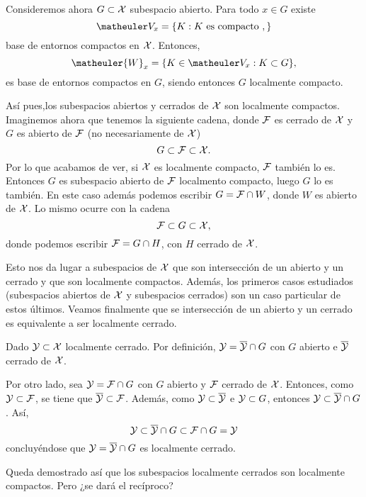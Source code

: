 Consideremos ahora $G\subset \mathcal{X}$ subespacio abierto. Para todo $x\in G$ existe
\[\Va{x}=\{K:K\text{ es compacto },\}\]
base de entornos compactos en $\mathcal{X}$. Entonces,
\[\matheuler{W}_x=\{K\in \Va{x}:K\subset G\},\]
es base de entornos compactos en $G$, siendo entonces $G$ localmente compacto.

Así pues,los subespacios abiertos y cerrados de $\mathcal{X}$ son localmente compactos. Imaginemos ahora que tenemos la siguiente cadena, donde $\mathcal{F}$ es cerrado de $\mathcal{X}$ y $G$ es abierto de $\mathcal{F}$ (no necesariamente de $\mathcal{X}$)
\[G\subset\mathcal{F}\subset\mathcal{X}.\]
Por lo que acabamos de ver, si $\mathcal{X}$ es localmente compacto, $\mathcal{F}$ también lo es. Entonces $G$ es subespacio abierto de $\mathcal{F}$ localmento compacto, luego $G$ lo es también. En este caso además podemos escribir $G=\mathcal{F}\cap W$, donde $W$ es abierto de $\mathcal{X}$. Lo mismo ocurre con la cadena
\[\mathcal{F}\subset G\subset\mathcal{X},\]
donde podemos escribir $\mathcal{F}=G\cap H$, con $H$ cerrado de $\mathcal{X}$.

Esto nos da lugar a subespacios de $\mathcal{X}$ que son intersección de un abierto y un cerrado y que son localmente compactos. Además, los primeros casos estudiados (subespacios abiertos de $\mathcal{X}$ y subespacios cerrados) son un caso particular de estos últimos. Veamos finalmente que se intersección de un abierto y un cerrado es equivalente a ser localmente cerrado.

Dado $\mathcal{Y}\subset\mathcal{X}$ localmente cerrado. Por definición, $\mathcal{Y}=\overline{\mathcal{Y}}\cap G$ con $G$ abierto e $\overline{\mathcal{Y}}$ cerrado de $\mathcal{X}$.

Por otro lado, sea $\mathcal{Y}=\mathcal{F}\cap G$ con $G$ abierto y $\mathcal{F}$ cerrado de $\mathcal{X}$. Entonces, como $\mathcal{Y}\subset\mathcal{F}$, se tiene que $\overline{\mathcal{Y}}\subset\mathcal{F}$. Además, como $\mathcal{Y}\subset\overline{\mathcal{Y}}$ e $\mathcal{Y}\subset G$, entonces $\mathcal{Y}\subset \overline{\mathcal{Y}}\cap G$. Así,
\[\mathcal{Y}\subset \overline{\mathcal{Y}}\cap G\subset \mathcal{F}\cap G=\mathcal{Y}\]
concluyéndose que $\mathcal{Y}=\overline{\mathcal{Y}}\cap G$ es localmente cerrado.

Queda demostrado así que los subespacios localmente cerrados son localmente compactos. Pero ¿se dará el recíproco?

